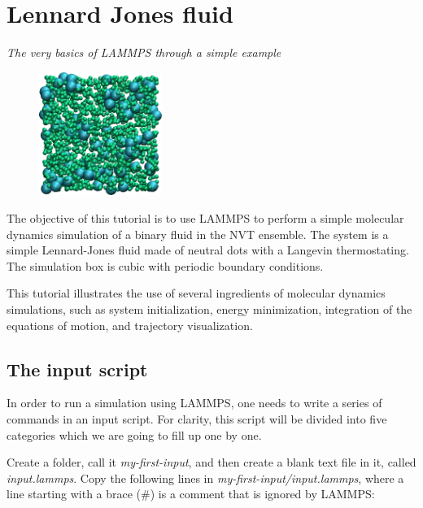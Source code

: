 \chapter{Lennard Jones fluid}
\label{lennard-jones-label}

\vspace{-1cm} \noindent \textcolor{graytitle}{\textit{{\Large The very basics of LAMMPS through a simple example}}\vspace{0.5cm} }

\noindent \hspace{-0.45cm}\begin{figure}
\includegraphics[width=4cm]{tutorials/level0/lennard-jones-fluid/binary_LJ_fluid_light.png}
\end{figure}

\noindent The objective of this tutorial is to use
LAMMPS to perform a simple molecular dynamics simulation
of a binary fluid in the NVT ensemble. The system is a simple Lennard-Jones fluid
made of neutral dots with a Langevin thermostating. The
simulation box is cubic with periodic boundary conditions.

This tutorial illustrates the use of several ingredients of
molecular dynamics simulations, such as system initialization,
energy minimization, integration of the equations of motion,
and trajectory visualization.

\section{The input script}

\noindent In order to run a simulation using LAMMPS, one needs to
write a series of commands in an input script. For clarity,
this script will be divided into five categories which we are going to
fill up one by one. 

Create a folder, call it \textit{my-first-input}, and then create a blank
text file in it, called \textit{input.lammps}. Copy the following lines
in \textit{my-first-input/input.lammps}, where a line starting with a brace ($\#$)
is a comment that is ignored by LAMMPS:

